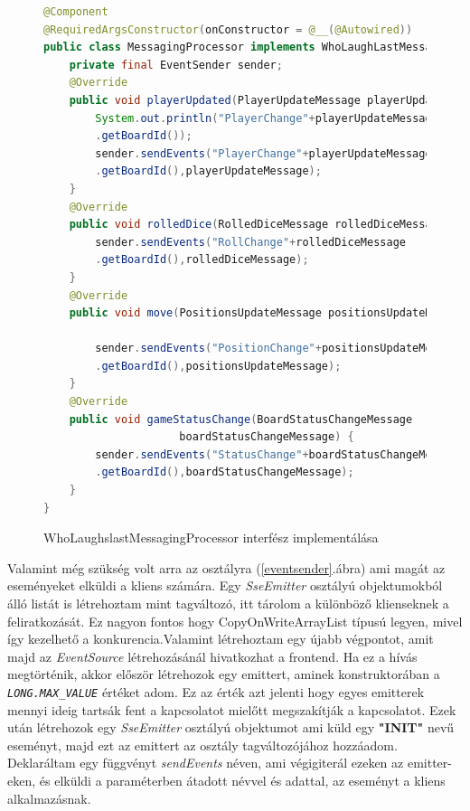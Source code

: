 \documentclass[a4paper,twoside]{article}
\begin{document}
\begin{figure}[h]
	\caption{WhoLaughslastMessagingProcessor interfész implementálása}
	\raggedleft
	\begin{lstlisting}[language=java]	
@Component
@RequiredArgsConstructor(onConstructor = @__(@Autowired))
public class MessagingProcessor implements WhoLaughLastMessagingProcessor{
	private final EventSender sender;
	@Override
	public void playerUpdated(PlayerUpdateMessage playerUpdateMessage) {
		System.out.println("PlayerChange"+playerUpdateMessage
		.getBoardId());
		sender.sendEvents("PlayerChange"+playerUpdateMessage
		.getBoardId(),playerUpdateMessage);
	}
	@Override
	public void rolledDice(RolledDiceMessage rolledDiceMessage) {
		sender.sendEvents("RollChange"+rolledDiceMessage
		.getBoardId(),rolledDiceMessage);
	}
	@Override
	public void move(PositionsUpdateMessage positionsUpdateMessage) {
		
		sender.sendEvents("PositionChange"+positionsUpdateMessage
		.getBoardId(),positionsUpdateMessage);
	}
	@Override
	public void gameStatusChange(BoardStatusChangeMessage
					 boardStatusChangeMessage) {
		sender.sendEvents("StatusChange"+boardStatusChangeMessage
		.getBoardId(),boardStatusChangeMessage);
	}
}
		\end{lstlisting}
		\label{messproc}
	\end{figure} 
Valamint még szükség volt arra az osztályra (\ref{eventsender}.ábra) ami magát az eseményeket elküldi a kliens számára.  Egy \textit{SseEmitter} osztályú objektumokból álló listát is létrehoztam mint tagváltozó, itt tárolom a különböző klienseknek a feliratkozását. Ez nagyon fontos hogy CopyOnWriteArrayList típusú legyen, mivel így kezelhető a konkurencia.Valamint létrehoztam egy újabb végpontot, amit majd az \textit{EventSource} létrehozásánál hivatkozhat a frontend.  Ha ez a hívás megtörténik, akkor először létrehozok egy emittert, aminek konstruktorában a \textit{\texttt{LONG.MAX\_VALUE}} értéket adom. Ez az érték azt jelenti hogy egyes emitterek mennyi ideig tartsák fent a kapcsolatot mielőtt megszakítják a kapcsolatot. Ezek után létrehozok egy \textit{SseEmitter} osztályú objektumot ami küld egy \textbf{"INIT"} nevű eseményt, majd ezt az emittert az osztály tagváltozójához hozzáadom. Deklaráltam egy függvényt \textit{sendEvents} néven, ami végigiterál ezeken az emitter-eken, és elküldi a paraméterben átadott névvel és adattal, az eseményt a kliens alkalmazásnak.   
\end{document}
